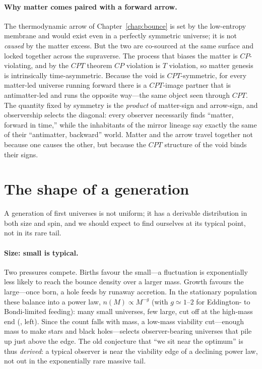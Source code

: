 \paragraph{Why matter comes paired with a forward arrow.} The thermodynamic arrow
of Chapter~\ref{chap:bounce} is set by the low-entropy membrane and would exist
even in a perfectly symmetric universe; it is not \emph{caused} by the matter
excess. But the two are co-sourced at the same surface and locked together across
the supraverse. The process that biases the matter is $CP$-violating, and by the
$CPT$ theorem $CP$ violation is $T$ violation, so matter genesis is intrinsically
time-asymmetric. Because the void is $CPT$-symmetric, for every matter-led
universe running forward there is a $CPT$-image partner that is antimatter-led and
runs the opposite way---the same object seen through $CPT$. The quantity fixed by
symmetry is the \emph{product} of matter-sign and arrow-sign, and observership
selects the diagonal: every observer necessarily finds ``matter, forward in
time,'' while the inhabitants of the mirror lineage say exactly the same of their
``antimatter, backward'' world. Matter and the arrow travel together not because
one causes the other, but because the $CPT$ structure of the void binds their
signs.

\section{The shape of a generation}
\label{sec:shape}

A generation of first universes is not uniform; it has a derivable distribution in
both size and spin, and we should expect to find ourselves at its typical point,
not in its rare tail.

\paragraph{Size: small is typical.} Two pressures compete. Births favour the
small---a fluctuation is exponentially less likely to reach the bounce density
over a larger mass. Growth favours the large---once born, a hole feeds by runaway
accretion. In the stationary population these balance into a power law,
$n(M)\propto M^{-g}$ (with $g\simeq1$--$2$ for Eddington- to Bondi-limited
feeding): many small universes, few large, cut off at the high-mass end
(, left). Since the count falls with mass, a low-mass viability
cut---enough mass to make stars and black holes---selects observer-bearing
universes that pile up just above the edge. The old conjecture that ``we sit near
the optimum'' is thus \emph{derived}: a typical observer is near the viability edge
of a declining power law, not out in the exponentially rare massive tail.

